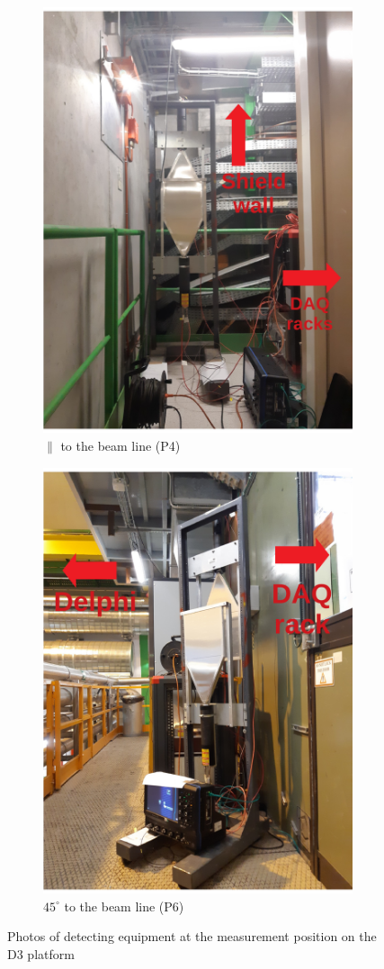 \begin{figure}[h]
\begin{subfigure}{}
        \includegraphics[width=0.5\columnwidth]{figs/INT/Othercorner.pdf} 
        \caption{$\parallel$ to the beam line (P4)}
        \label{fig:sub3}
    \end{subfigure}
    \begin{subfigure}{}
        \centering
        \includegraphics[width=0.5\columnwidth]{figs/INT/D3_front.pdf} 
        \caption{$45^\circ$ to the beam line (P6)}
        \label{fig:sub4}
    \end{subfigure}
\caption{
    Photos of detecting equipment at the measurement position on the D3 platform
}
\end{figure}


